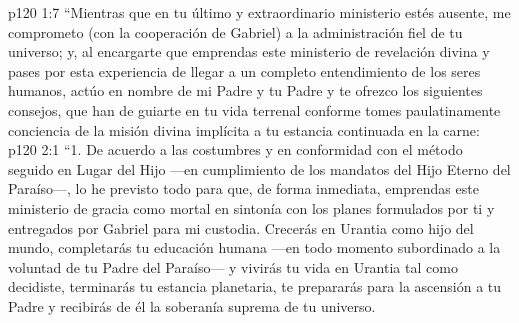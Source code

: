 \vs p120 1:7 “Mientras que en tu último y extraordinario ministerio estés ausente, me comprometo (con la cooperación de Gabriel) a la administración fiel de tu universo; y, al encargarte que emprendas este ministerio de revelación divina y pases por esta experiencia de llegar a un completo entendimiento de los seres humanos, actúo en nombre de mi Padre y tu Padre y te ofrezco los siguientes consejos, que han de guiarte en tu vida terrenal conforme tomes paulatinamente conciencia de la misión divina implícita a tu estancia continuada en la carne:
\vs p120 2:1 “1. De acuerdo a las costumbres y en conformidad con el método seguido en Lugar del Hijo ---en cumplimiento de los mandatos del Hijo Eterno del Paraíso---, lo he previsto todo para que, de forma inmediata, emprendas este ministerio de gracia como mortal en sintonía con los planes formulados por ti y entregados por Gabriel para mi custodia. Crecerás en Urantia como hijo del mundo, completarás tu educación humana ---en todo momento subordinado a la voluntad de tu Padre del Paraíso--- y vivirás tu vida en Urantia tal como decidiste, terminarás tu estancia planetaria, te prepararás para la ascensión a tu Padre y recibirás de él la soberanía suprema de tu universo.
